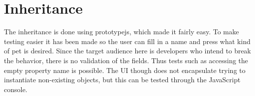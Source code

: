\documentclass[a4paper,10pt]{article}
\begin{document}
\section*{Inheritance}
The inheritance is done using prototypejs, which made it fairly easy.
To make testing easier it has been made so the user can fill in a name
and press what kind of pet is desired.  Since the target audience here
is developers who intend to break the behavior, there is no validation
of the fields.  Thus tests such as accessing the empty property name
is possible.  The UI though does not encapsulate trying to instantiate
non-existing objects, but this can be tested through the JavaScript
console.
\end{document}
